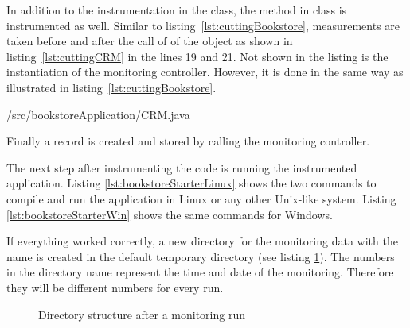 \noindent In addition to the instrumentation in the  class, the  method in class  is instrumented as well. Similar to listing~\ref{lst:cuttingBookstore}, measurements are taken before and after the call of  of the  object as shown in listing~\ref{lst:cuttingCRM} in the lines 19 and 21. Not shown in the listing is the instantiation of the monitoring controller. However, it is done in the same way as illustrated in listing~\ref{lst:cuttingBookstore}. 

\setJavaCodeListing
%
{\manualInstrumentedBookstoreApplicationDir/src/bookstoreApplication/CRM.java}

\noindent Finally a record is created and stored by calling the monitoring controller.

The next step after instrumenting the code is running the instrumented application. Listing \ref{lst:bookstoreStarterLinux} shows the two commands to compile and run the application in Linux or any other Unix-like system. Listing \ref{lst:bookstoreStarterWin} shows the same commands for Windows.

\setBashListing 		
	




If everything worked correctly, a new directory for the monitoring data with the name  is created in the default temporary directory (see listing \ref{fig:logtree}). The numbers in the directory name represent the time and date of the monitoring. Therefore they will be different numbers for every run.

\begin{figure}[H]
\begin{graybox}
\end{graybox}
\caption{Directory structure after a monitoring run}
\label{fig:logtree}
\end{figure}

